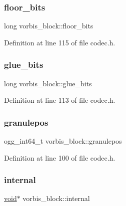 \mbox{\label{structvorbis__block_ac96102ac7115856ff07be7cebeb6de37}} 
\subsubsection{\texorpdfstring{floor\_bits}{floor\_bits}}
{\footnotesize\ttfamily long vorbis\+\_\+block\+::floor\+\_\+bits}



Definition at line 115 of file codec.\+h.

\mbox{\label{structvorbis__block_ae1456c556d8365c41ec816956759074b}} 
\subsubsection{\texorpdfstring{glue\_bits}{glue\_bits}}
{\footnotesize\ttfamily long vorbis\+\_\+block\+::glue\+\_\+bits}



Definition at line 113 of file codec.\+h.

\mbox{\label{structvorbis__block_a3dc7d5e474ae80ea641df91eba16b490}} 
\subsubsection{\texorpdfstring{granulepos}{granulepos}}
{\footnotesize\ttfamily ogg\+\_\+int64\+\_\+t vorbis\+\_\+block\+::granulepos}



Definition at line 100 of file codec.\+h.

\mbox{\label{structvorbis__block_ab506fee4272b6e8c634516c1cbb1e638}} 
\subsubsection{\texorpdfstring{internal}{internal}}
{\footnotesize\ttfamily \mbox{\hyperlink{_s_d_l__opengles2__gl2ext_8h_ae5d8fa23ad07c48bb609509eae494c95}{void}}$\ast$ vorbis\+\_\+block\+::internal}



